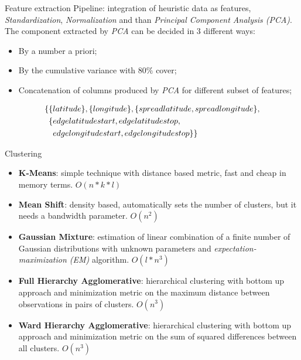\documentclass{beamer}
\begin{document}
\begin{frame}{Feature extraction}
Pipeline: integration of heuristic data as features, \textit{Standardization}, \textit{Normalization} and than \textit{Principal Component Analysis (PCA)}. 
\vfill
The component extracted by \textit{PCA} can be decided in 3 different ways:
\begin{itemize}
	\item By a number a priori;
	\item By the cumulative variance with $80\%$ cover;
	\item Concatenation of columns produced by \textit{PCA} for different subset of features;
\end{itemize}
\begin{align}
\{ &\{ latitude\} , \{longitude\}, \{spread\-latitude, spread\-longitude\}, \notag\\
&\{edge\-latitude\-start, edge\-latitude\-stop, \notag\\ 
&\phantom{\{}edge\-longitude\-start, edge\-longitude\-stop\} \}\notag
\end{align} 
\end{frame}

\begin{frame}{Clustering}
\begin{itemize}
	\item \textbf{K-Means}: simple technique with distance based metric, fast and cheap in memory terms. $O(n*k*l)$
	\item \textbf{Mean Shift}: density based, automatically sets the number of clusters, but it needs a bandwidth parameter. $O(n ^ 2)$
	\item \textbf{Gaussian Mixture}: estimation of linear combination of a finite number of Gaussian distributions with unknown parameters and \textit{expectation-maximization (EM)} algorithm. $O(l * n ^ 3)$
	\item \textbf{Full Hierarchy Agglomerative}: hierarchical clustering with bottom up approach and minimization metric on the maximum distance between observations in pairs of clusters. $O(n ^ 3)$
	\item \textbf{Ward Hierarchy Agglomerative}: hierarchical clustering with bottom up approach and minimization metric on the sum of squared differences between all clusters. $O(n ^ 3)$
\end{itemize}
\end{frame}
\end{document}
